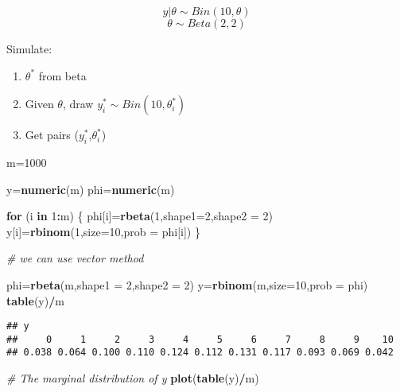 \documentclass[]{book}
\newenvironment{Shaded}{\begin{snugshade}}{\end{snugshade}}
\newcommand{\CommentTok}[1]{\textcolor[rgb]{0.56,0.35,0.01}{\textit{#1}}}
\newcommand{\ControlFlowTok}[1]{\textcolor[rgb]{0.13,0.29,0.53}{\textbf{#1}}}
\newcommand{\DataTypeTok}[1]{\textcolor[rgb]{0.13,0.29,0.53}{#1}}
\newcommand{\DecValTok}[1]{\textcolor[rgb]{0.00,0.00,0.81}{#1}}
\newcommand{\KeywordTok}[1]{\textcolor[rgb]{0.13,0.29,0.53}{\textbf{#1}}}
\newcommand{\NormalTok}[1]{#1}
\newcommand{\OperatorTok}[1]{\textcolor[rgb]{0.81,0.36,0.00}{\textbf{#1}}}
\begin{document}
\[y|\theta \sim Bin(10, \theta)\]
\[\theta \sim Beta(2,2)\]

Simulate:

\begin{enumerate}
\def\labelenumi{(\arabic{enumi})}
\item
  \(\theta^*\) from beta
\item
  Given \(\theta\), draw \(y_i^* \sim Bin(10, \theta_i^*)\)
\item
  Get pairs (\(y_i^*\),\(\theta_i^*\))
\end{enumerate}

\begin{Shaded}
\begin{Highlighting}[]
\NormalTok{m=}\DecValTok{1000}

\NormalTok{y=}\KeywordTok{numeric}\NormalTok{(m)}
\NormalTok{phi=}\KeywordTok{numeric}\NormalTok{(m)}

\ControlFlowTok{for}\NormalTok{ (i }\ControlFlowTok{in} \DecValTok{1}\OperatorTok{:}\NormalTok{m)}
\NormalTok{\{}
\NormalTok{  phi[i]=}\KeywordTok{rbeta}\NormalTok{(}\DecValTok{1}\NormalTok{,}\DataTypeTok{shape1=}\DecValTok{2}\NormalTok{,}\DataTypeTok{shape2 =} \DecValTok{2}\NormalTok{)}
\NormalTok{  y[i]=}\KeywordTok{rbinom}\NormalTok{(}\DecValTok{1}\NormalTok{,}\DataTypeTok{size=}\DecValTok{10}\NormalTok{,}\DataTypeTok{prob =}\NormalTok{ phi[i])}
\NormalTok{\}}

\CommentTok{# we can use vector method}

\NormalTok{phi=}\KeywordTok{rbeta}\NormalTok{(m,}\DataTypeTok{shape1 =} \DecValTok{2}\NormalTok{,}\DataTypeTok{shape2 =} \DecValTok{2}\NormalTok{)}
\NormalTok{y=}\KeywordTok{rbinom}\NormalTok{(m,}\DataTypeTok{size=}\DecValTok{10}\NormalTok{,}\DataTypeTok{prob =}\NormalTok{ phi)}
\KeywordTok{table}\NormalTok{(y)}\OperatorTok{/}\NormalTok{m}
\end{Highlighting}
\end{Shaded}

\begin{verbatim}
## y
##     0     1     2     3     4     5     6     7     8     9    10 
## 0.038 0.064 0.100 0.110 0.124 0.112 0.131 0.117 0.093 0.069 0.042
\end{verbatim}

\begin{Shaded}
\begin{Highlighting}[]
\CommentTok{# The marginal distribution of y}
\KeywordTok{plot}\NormalTok{(}\KeywordTok{table}\NormalTok{(y)}\OperatorTok{/}\NormalTok{m)}
\end{Highlighting}
\end{Shaded}
\end{document}

